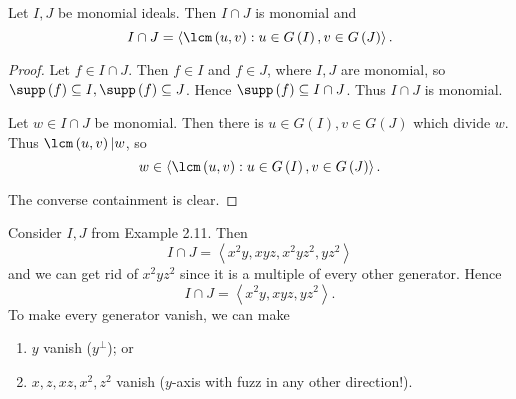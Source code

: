 \documentclass[co439]{subfiles}
\begin{document}
    \rruleline

    \clearpage
    
    \begin{prop}{}
        Let $I,J$ be monomial ideals. Then $I\cap J$ is monomial and
        \begin{equation*}
            I\cap J = \left< \lcm\left( u,v \right): u\in G\left( I \right), v\in G\left( J \right) \right>. 
        \end{equation*}
    \end{prop}
    
    \begin{proof}
        Let $f\in I\cap J$. Then $f\in I$ and $f\in J$, where $I,J$ are monomial, so $\supp\left( f \right)\subseteq I, \supp\left( f \right)\subseteq J$. Hence $\supp\left( f \right)\subseteq I\cap J$. Thus $I\cap J$ is monomial.

        Let $w\in I\cap J$ be monomial. Then there is $u\in G\left( I \right), v\in G\left( J \right)$ which divide $w$. Thus $\lcm\left( u,v \right)|w$, so 
        \begin{equation*}
            w\in \left< \lcm\left( u,v \right): u\in G\left( I \right), v\in G\left( J \right) \right>.
        \end{equation*}

        The converse containment is clear.
    \end{proof}

    \begin{example}{}
        Consider $I,J$ from Example 2.11. Then
        \begin{equation*}
            I\cap J = \left< x^{2}y, xyz, x^{2}yz^{2}, yz^{2} \right> 
        \end{equation*}
        and we can get rid of $x^{2}yz^{2}$ since it is a multiple of every other generator. Hence
        \begin{equation*}
            I\cap J = \left< x^{2}y, xyz, yz^{2} \right>. 
        \end{equation*}
        To make every generator vanish, we can make
        \begin{enumerate}
            \item $y$ vanish ($y^{\perp}$); or
            \item $x,z,xz,x^{2},z^{2}$ vanish ($y$-axis with fuzz in any other direction!).
        \end{enumerate}
    \end{example}

    \rruleline
    
\end{document}
